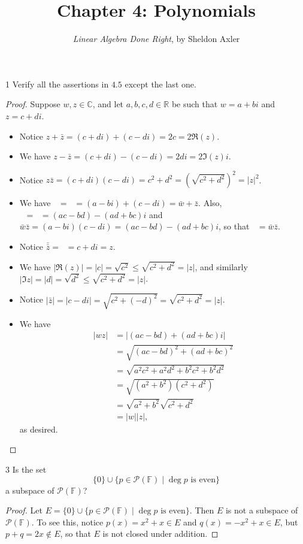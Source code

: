 \documentclass[11pt]{extarticle}
\title{\vspace{-2em}Chapter 4: Polynomials}
\author{\emph{Linear Algebra Done Right}, by Sheldon Axler}
\newenvironment{problem}[1]{\begin{prob*}{#1}{}}{\end{prob*}}
\newcommand{\R}{\mathbb{R}}
\newcommand{\C}{\mathbb{C}}
\newcommand{\F}{\mathbb{F}}
\newcommand{\poly}{\mathcal{P}}
\newcommand\widebar[1]{\mathop{\overline{#1}}}
\begin{document}
\maketitle


\begin{problem}{1}
Verify all the assertions in $4.5$ except the last one.
\end{problem}
\begin{proof}
Suppose $w,z \in\C$, and let $a,b,c,d\in\R$ be such that $w = a+bi$ and $z = c + di$.
\begin{itemize}
\item Notice $z + \bar{z} = (c + di) + (c - di) = 2c = 2\Re(z)$.
\item We have $z - \bar{z} = (c + di) - (c - di) = 2di = 2\Im(z)i$.  
\item Notice $z\bar{z} = (c + di)(c - di) = c^2 + d^2 = \left(\sqrt{c^2 + d^2}\right)^2 = \left |z\right |^2$.
\item We have $\widebar{w + z} = \widebar{(a + c) + (b + d)i} = (a - bi) + (c - di) = \bar{w} + \bar{z}$.  Also, $\widebar{wz} = \widebar{(ac - bd) + (ad + bc)i} = (ac - bd) - (ad + bc)i$ and $\bar{w}\bar{z} = (a-bi)(c-di) = (ac - bd)-(ad + bc)i$, so that $\widebar{wz} = \bar{w}\bar{z}$.
\item Notice $\bar{\bar{z}} = \widebar{c - di} = c + di = z$.
\item We have $\left|\Re(z)\right| = \left|c\right| = \sqrt{c^2}\leq \sqrt{c^2 + d^2} = \left|z\right|$, and similarly $\left|\Im{z}\right| = \left|d\right| = \sqrt{d^2}\leq \sqrt{c^2 + d^2} = \left|z\right|$.
\item Notice $\left|\bar{z}\right| = \left|c - di\right| = \sqrt{c^2 + (-d)^2} = \sqrt{c^2 + d^2} = \left|z\right|$.
\item We have 
\begin{align*}
\left|wz\right| &= \left|(ac - bd) + (ad + bc)i\right|\\
&= \sqrt{(ac - bd)^2 + (ad + bc)^2}\\
&= \sqrt{a^2c^2 + a^2d^2 +b^2c^2 + b^2d^2}\\
&= \sqrt{(a^2 + b^2)(c^2 + d^2)}\\
&= \sqrt{a^2 + b^2}\sqrt{c^2 + d^2}\\
&= \left|w\right|\left| z\right|,
\end{align*}
as desired.
\end{itemize}
\end{proof}

\begin{problem}{3}
Is the set
\begin{equation*}
\{0\} \cup \{p\in\poly(\F)\mid \deg p\text{ is even}\}
\end{equation*}
a subspace of $\poly(\F)$?
\end{problem}
\begin{proof}
Let $E = \{0\} \cup \{p\in\poly(\F)\mid \deg p\text{ is even}\}$.  Then $E$ is not a subspace of $\poly(\F)$.  To see this, notice $p(x) = x^2 + x\in E$ and $q(x) = -x^2 + x\in E$, but $p + q = 2x\not\in E$, so that $E$ is not closed under addition.
\end{proof}
\end{document}
